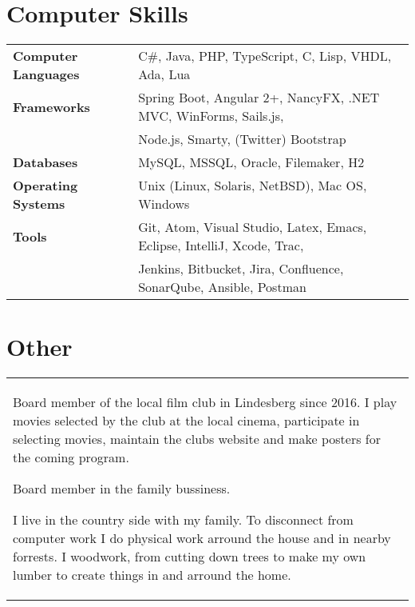 \documentclass{cv-stylish}
\begin{document}
\begin{center}

\section{Computer Skills}

\begin{tabular}{ @{} >{\bfseries}l @{\hspace{6ex}} l }
Computer Languages & C\#, Java, PHP, TypeScript, C, Lisp, VHDL, Ada, Lua \\
Frameworks & Spring Boot, Angular 2+, NancyFX, .NET MVC, WinForms, Sails.js, \\
         & Node.js, Smarty, (Twitter) Bootstrap \\
Databases & MySQL, MSSQL, Oracle, Filemaker, H2 \\
Operating Systems & Unix (Linux, Solaris, NetBSD), Mac OS, Windows \\
Tools & Git, Atom, Visual Studio, Latex, Emacs, Eclipse, IntelliJ,
        Xcode, Trac, \\
      &  Jenkins, Bitbucket, Jira, Confluence, SonarQube, Ansible, Postman
\end{tabular}



\section{Other}

\begin{tabularx}{0.97\linewidth}{X}
Board member of the local film club in Lindesberg since 2016. I play
movies selected by the club at the local cinema, participate in
selecting movies, maintain the clubs website and make posters for the
coming program.

\vspace{10pt}

Board member in the family bussiness.

\vspace{10pt}

I live in the country side with my family. To disconnect from
computer work I do physical work arround the house and in nearby
forrests. I woodwork, from cutting down trees to make my own lumber to
create things in and arround the home.
\end{tabularx}

\end{center}
\end{document}

